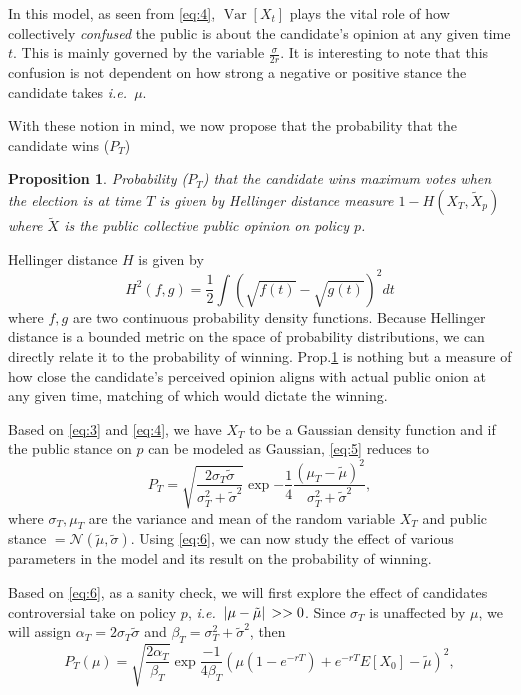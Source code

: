 \documentclass[aps,prl,twocolumn,showpacs,final]{revtex4-1}
\newcommand{\ie}{\textit{i.e.\ }}
\newtheorem{prop}{Proposition}[section]
\newcommand\pN{\mathcal{N}}
\begin{document}
In this model, as seen from \eqref{eq:4}, $\operatorname{Var}[X_t]$ plays the vital role of how collectively \textit{confused} the public is about the candidate's opinion at any given time $t$. This is mainly governed by the variable $\frac{\sigma}{2r}$. It is interesting to note that this confusion is not dependent on how strong a negative or positive stance the candidate takes \ie $\mu$. 

With these notion in mind, we now propose that the probability that the candidate wins ($P_T$)

\begin{prop}
\label{prop1}
Probability  ($P_T$) that the candidate wins maximum votes when the election is at time $T$ is given by Hellinger distance measure $1-H(X_T,\tilde{X}_p)$ where  $\tilde{X}$ is the public collective public opinion on policy $p$.
\end{prop}

Hellinger distance $H$ is given by\cite{hellinger1909neue} 
\begin{equation}
H^{2}(f, g)=
\frac{1}{2} \int(\sqrt{f(t)}-\sqrt{g(t)})^{2} d t\label{eq:5}
\end{equation}
where $f,g$ are two continuous probability density functions. Because Hellinger distance is a bounded metric on the space of probability distributions, we can directly relate it to the probability of winning. Prop.\ref{prop1} is nothing but a measure of how close the candidate's perceived opinion aligns with actual public onion at any given time, matching of which would dictate the winning.

Based on \eqref{eq:3} and \ref{eq:4}, we have $X_T$ to be a Gaussian density function and if the public stance on $p$ can be modeled as Gaussian, \eqref{eq:5} reduces to 
\begin{equation}
P_T=\sqrt{\frac{2 \sigma_{T} \tilde{\sigma}}{\sigma_{T}^{2}+\tilde{\sigma}^{2}}} \exp{-\frac{1}{4} \frac{\left(\mu_{T}-\tilde{\mu}\right)^{2}}{\sigma_{T}^{2}+\tilde{\sigma}^{2}}}\label{eq:6},
\end{equation}
where $\sigma_T,\mu_T$ are the variance and mean of the random variable $X_T$ and public stance $=\pN(\tilde{\mu},\tilde{\sigma})$. Using \eqref{eq:6}, we can now study the effect of various parameters in the model and its result on the probability of winning.

Based on \eqref{eq:6}, as a sanity check, we will first explore the effect of candidates controversial take on policy $p$, \ie $\abs*{\mu-\tilde{\mu}}>>0$. Since $\sigma_T$ is unaffected by $\mu$, we will assign $\alpha_T=2 \sigma_{T} \tilde{\sigma}$ and $\beta_T=\sigma_{T}^{2}+\tilde{\sigma}^{2}$, then 
\begin{dmath}
P_T(\mu)=\sqrt{\frac{2\alpha_T}{\beta_T}}\exp{\frac{-1}{4\beta_T}\left(\mu\left(1-e^{-r T}\right)+e^{-r T} E \left[X_{0}\right]-\tilde{\mu}\right)^2}\label{eq:7},
\end{dmath}
\end{document}
